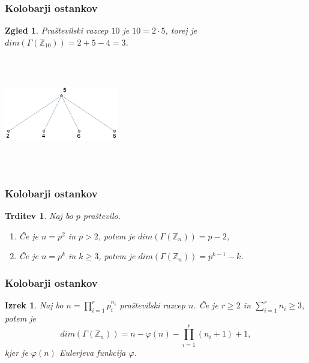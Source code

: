 \documentclass{beamer}
\def\Z{\mathbb{Z}} %
\newtheorem{izrek}{Izrek}
\newtheorem{trditev}{Trditev}
\newtheorem{zgled}{Zgled}
\begin{document}
\begin{frame}
    \frametitle{Kolobarji ostankov}
    \begin{zgled}
        Praštevilski razcep $10$ je $10 = 2\cdot5$, torej je 
        $dim(\Gamma(\Z_{10})) = 2 + 5 - 4 = 3$.
    \end{zgled}
    \begin{center}
        \includegraphics[width=5cm, height=5cm]{z10.png}
    \end{center}
    
\end{frame}    


\begin{frame}
    \frametitle{Kolobarji ostankov}
    \begin{trditev}
        Naj bo $p$ praštevilo.
    \begin{enumerate}
        \item Če je $n = p^2$ in $p > 2$, potem je $dim(\Gamma(\Z_{n})) = p - 2$,
        \item Če je $n = p^k$ in $k \geq 3$, potem je $dim(\Gamma(\Z_{n})) = p^{k-1} - k$.
    \end{enumerate}
    \end{trditev}
    
\end{frame}


\begin{frame}
    \frametitle{Kolobarji ostankov}
    \begin{izrek}
        Naj bo $n = \prod_{i = 1}^{r}p_i^{n_i}$ praštevilski razcep $n$. Če je $r \geq 2$ in 
        $\sum_{i=1}^{r}n_i \geq 3$, potem je 
        \begin{equation*}
            dim(\Gamma(\Z_{n})) = n - \varphi(n) - \prod_{i = 1}^{r}(n_i + 1) + 1,
        \end{equation*}
        kjer je $\varphi(n)$ Eulerjeva funkcija $\varphi$.
    \end{izrek}
    
\end{frame}
\end{document}
